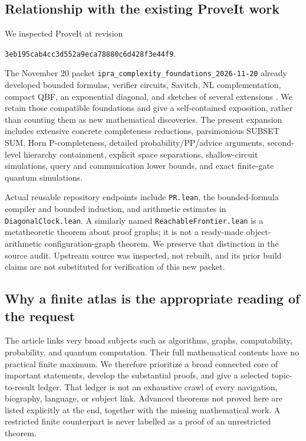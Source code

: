\subsection{Relationship with the existing ProveIt work}
We inspected ProveIt at revision
\begin{center}\small\texttt{3eb195cab4cc3d552a9eca78880c6d428f3e44f9}.\end{center}
The November 20 packet \texttt{ipra\_complexity\_foundations\_2026-11-20} already developed bounded formulas, verifier circuits, Savitch, NL complementation, compact QBF, an exponential diagonal, and sketches of several extensions \cite{ProveItBaseline}. We retain those compatible foundations and give a self-contained exposition, rather than counting them as new mathematical discoveries. The present expansion includes extensive concrete completeness reductions, parsimonious SUBSET SUM, Horn P-completeness, detailed probability/PP/advice arguments, second-level hierarchy containment, explicit space separations, shallow-circuit simulations, query and communication lower bounds, and exact finite-gate quantum simulations.

Actual reusable repository endpoints include \texttt{PR.lean}, the bounded-formula compiler and bounded induction, and arithmetic estimates in \texttt{DiagonalClock.lean}. A similarly named \texttt{ReachableFrontier.lean} is a metatheoretic theorem about proof graphs; it is not a ready-made object-arithmetic configuration-graph theorem. We preserve that distinction in the source audit. Upstream source was inspected, not rebuilt, and its prior build claims are not substituted for verification of this new packet.

\subsection{Why a finite atlas is the appropriate reading of the request}
The article links very broad subjects such as algorithms, graphs, computability, probability, and quantum computation. Their full mathematical contents have no practical finite maximum. We therefore prioritize a broad connected core of important statements, develop the substantial proofs, and give a selected topic-to-result ledger. That ledger is not an exhaustive crawl of every navigation, biography, language, or subject link. Advanced theorems not proved here are listed explicitly at the end, together with the missing mathematical work. A restricted finite counterpart is never labelled as a proof of an unrestricted theorem.
